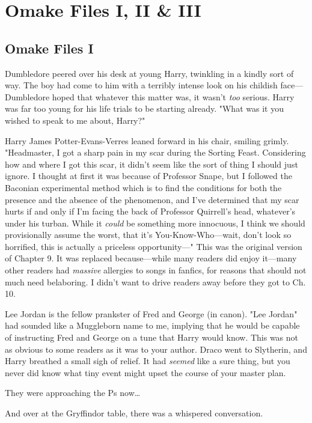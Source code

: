 \chapter{Omake Files I, II \& III}

\section{Omake Files I}
Dumbledore peered over his desk at young Harry, twinkling in a kindly sort of
way. The boy had come to him with a terribly intense look on his childish
face---Dumbledore hoped that whatever this matter was, it wasn't \emph{too}
serious. Harry was far too young for his life trials to be starting already.
"What was it you wished to speak to me about, Harry?"

Harry James Potter-Evans-Verres leaned forward in his chair, smiling grimly.
"Headmaster, I got a sharp pain in my scar during the Sorting Feast.
Considering how and where I got this scar, it didn't seem like the sort of
thing I should just ignore. I thought at first it was because of Professor
Snape, but I followed the Baconian experimental method which is to find the
conditions for both the presence and the absence of the phenomenon, and I've
determined that my scar hurts if and only if I'm facing the back of Professor
Quirrell's head, whatever's under his turban. While it \emph{could} be
something more innocuous, I think we should provisionally assume the worst,
that it's You-Know-Who---wait, don't look so horrified, this is actually a
priceless opportunity---"
This was the original version of Chapter 9. It was replaced because---while
many readers did enjoy it---many other readers had \emph{massive} allergies to
songs in fanfics, for reasons that should not much need belaboring. I didn't
want to drive readers away before they got to Ch. 10.

Lee Jordan is the fellow prankster of Fred and George (in canon). "Lee Jordan"
had sounded like a Muggleborn name to me, implying that he would be capable of
instructing Fred and George on a tune that Harry would know. This was not as
obvious to some readers as it was to your author.
\later
Draco went to Slytherin, and Harry breathed a small sigh of relief. It had
\emph{seemed} like a sure thing, but you never did know what tiny event might
upset the course of your master plan.

They were approaching the Ps now…

And over at the Gryffindor table, there was a whispered conversation.


